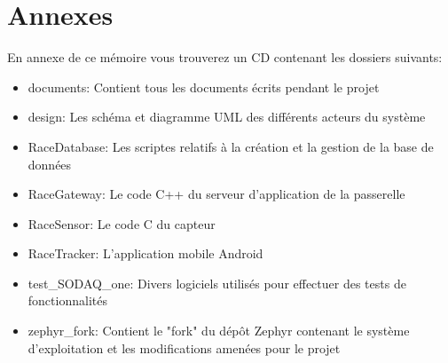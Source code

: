 
\chapter{Annexes}

En annexe de ce mémoire vous trouverez un CD contenant les dossiers suivants:

\begin{itemize}
\item documents: Contient tous les documents écrits pendant le projet
\item design: Les schéma et diagramme UML des différents acteurs du système
\item RaceDatabase: Les scriptes relatifs à la création et la gestion de la base de données
\item RaceGateway: Le code C++ du serveur d'application de la passerelle
\item RaceSensor: Le code C du capteur
\item RaceTracker: L'application mobile Android
\item test\_SODAQ\_one: Divers logiciels utilisés pour effectuer des tests de fonctionnalités
\item zephyr\_fork: Contient le "fork" du dépôt Zephyr contenant le système d'exploitation et les modifications amenées pour le projet
\end{itemize}